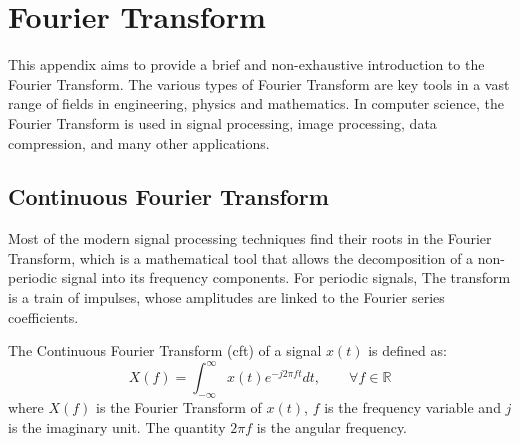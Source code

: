 \chapter{Fourier Transform}
\label{app:FFT}
This appendix aims to provide a brief and non-exhaustive introduction to the Fourier Transform. The various types of Fourier Transform are key tools in a vast range of fields in engineering, physics and mathematics. In computer science, the Fourier Transform is used in signal processing, image processing, data compression, and many other applications.

\section{Continuous Fourier Transform}
\label{sec:ContinuousFourierTransform}
Most of the modern signal processing techniques find their roots in the Fourier Transform, which is a mathematical tool that allows the decomposition of a non-periodic signal into its frequency components. For periodic signals, The transform is a train of impulses, whose amplitudes are linked to the Fourier series coefficients.

The Continuous Fourier Transform (\gls{cft}) of a signal $x(t)$ is defined as:
$$
X(f) = \int_{-\infty}^{\infty} x(t) e^{-j2\pi ft} dt, \qquad \forall f \in \mathbb{R}
$$
where $X(f)$ is the Fourier Transform of $x(t)$, $f$ is the frequency variable and $j$ is the imaginary unit. The quantity $2\pi f$ is the angular frequency.